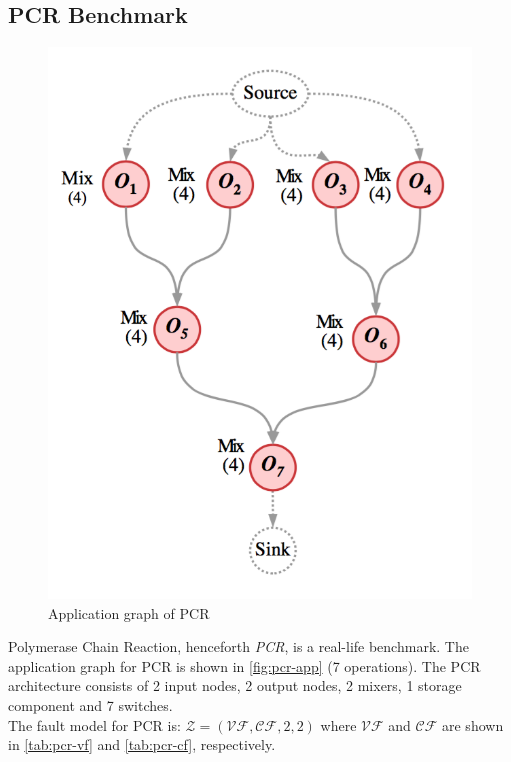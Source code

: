 \subsection{PCR Benchmark}
\begin{figure}[H]
\centering
\includegraphics[scale=0.3]{figures/pcr-application.png}
\caption[Application graph for PCR]{Application graph of PCR}
\label{fig:pcr-app}
\end{figure}

Polymerase Chain Reaction, henceforth \emph{PCR}, is a real-life benchmark. The application graph for PCR is shown in \autoref{fig:pcr-app} (7 operations). The PCR architecture consists of 2 input nodes, 2 output nodes, 2 mixers, 1 storage component and 7 switches.\\
The fault model for PCR is: $\mathcal{Z} = (\mathcal{VF}, \mathcal{CF}, 2, 2)$ where $\mathcal{VF}$ and $\mathcal{CF}$ are shown in \autoref{tab:pcr-vf} and \autoref{tab:pcr-cf}, respectively.

